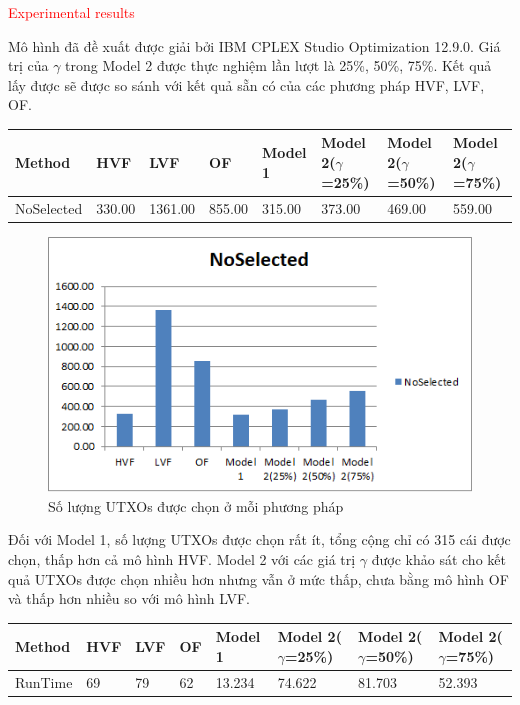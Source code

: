\documentclass[a4paper]{article}
\begin{document}
\textcolor{red}{Experimental results}

Mô hình đã đề xuất được giải bởi IBM CPLEX Studio Optimization 12.9.0. Giá trị của $\gamma$ trong Model 2 được thực nghiệm lần lượt là 25\%, 50\%, 75\%. Kết quả lấy được sẽ được so sánh với kết quả sẵn có của các phương pháp HVF, LVF, OF.

\begin{table}[ht]
	\begin{tabular}{|l|l|l|l|l|l|l|l|}
		\hline
		Method     & HVF    & LVF     & OF     & Model 1 & Model 2($\gamma$=25\%) & Model 2($\gamma$=50\%) & Model 2($\gamma$=75\%) \\ \hline
		NoSelected & 330.00 & 1361.00 & 855.00 & 315.00  & 373.00        & 469.00        & 559.00        \\ \hline
	\end{tabular}
\end{table}

\begin{center}
	\begin{figure} [ht]
		\begin{center}
			\includegraphics[scale=1]{NoSelected}
		\end{center}
		\caption{Số lượng UTXOs được chọn ở mỗi phương pháp}
		\label{refhinh1}
	\end{figure}
\end{center}

Đối với Model 1, số lượng UTXOs được chọn rất ít, tổng cộng chỉ có 315 cái được chọn, thấp hơn cả mô hình HVF. Model 2 với các giá trị $\gamma$ được khảo sát cho kết quả UTXOs được chọn nhiều hơn nhưng vẫn ở mức thấp, chưa bằng mô hình OF và thấp hơn nhiều so với mô hình LVF.

\begin{table}[ht]
	\begin{tabular}{|l|l|l|l|l|l|l|l|}
		\hline
		Method  & HVF & LVF & OF & Model 1 & Model 2($\gamma$=25\%) & Model 2($\gamma$=50\%) & Model 2($\gamma$=75\%) \\ \hline
		RunTime & 69  & 79  & 62 & 13.234  & 74.622        & 81.703        & 52.393        \\ \hline
	\end{tabular}
\end{table}
\end{document}
